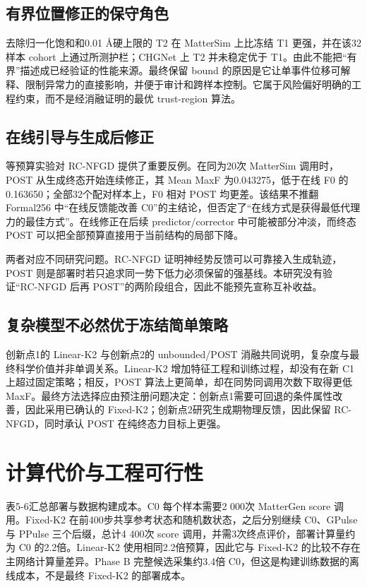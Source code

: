 \subsection{有界位置修正的保守角色}

去除归一化饱和和0.01 Å硬上限的 T2 在 Matter\allowbreak Sim 上比冻结 T1 更强，并在该32样本 cohort 上通过所测护栏；CHGNet 上 T2 并未稳定优于 T1。由此不能把``有界''描述成已经验证的性能来源。最终保留 bound 的原因是它让单事件位移可解释、限制异常力的直接影响，并便于审计和跨样本控制。它属于风险偏好明确的工程约束，而不是经消融证明的最优 trust-region 算法。

\subsection{在线引导与生成后修正}

等预算实验对 RC-NFGD 提供了重要反例。在同为20次 Matter\allowbreak Sim 调用时，POST 从生成终态开始连续修正，其 Mean MaxF 为0.043275，低于在线 F0 的0.163650；全部32个配对样本上，F0 相对 POST 均更差。该结果不推翻 Formal256 中``在线反馈能改善 C0''的主结论，但否定了``在线方式是获得最低代理力的最佳方式''。在线修正在后续 predictor/corrector 中可能被部分冲淡，而终态 POST 可以把全部预算直接用于当前结构的局部下降。

两者对应不同研究问题。RC-NFGD 证明神经势反馈可以可靠接入生成轨迹，POST 则是部署时若只追求同一势下低力必须保留的强基线。本研究没有验证``RC-NFGD 后再 POST''的两阶段组合，因此不能预先宣称互补收益。

\subsection{复杂模型不必然优于冻结简单策略}

创新点1的 Linear-K2 与创新点2的 unbounded/POST 消融共同说明，复杂度与最终科学价值并非单调关系。Linear-K2 增加特征工程和训练过程，却没有在新 C1 上超过固定策略；相反，POST 算法上更简单，却在同势同调用次数下取得更低 MaxF。最终方法选择应由预注册问题决定：创新点1需要可回退的条件属性改善，因此采用已确认的 Fixed-K2；创新点2研究生成期物理反馈，因此保留 RC-NFGD，同时承认 POST 在纯终态力目标上更强。

\section{计算代价与工程可行性}

表5-6汇总部署与数据构建成本。C0 每个样本需要2 000次 MatterGen score 调用。Fixed-K2 在前400步共享参考状态和随机数状态，之后分别继续 C0、GPulse 与 PPulse 三个后缀，总计4 400次 score 调用，并需3次终点评价，部署计算量约为 C0 的2.2倍。Linear-K2 使用相同2.2倍预算，因此它与 Fixed-K2 的比较不存在主网络计算量差异。Phase B 完整候选采集约3.4倍 C0，但这是构建训练数据的离线成本，不是最终 Fixed-K2 的部署成本。

